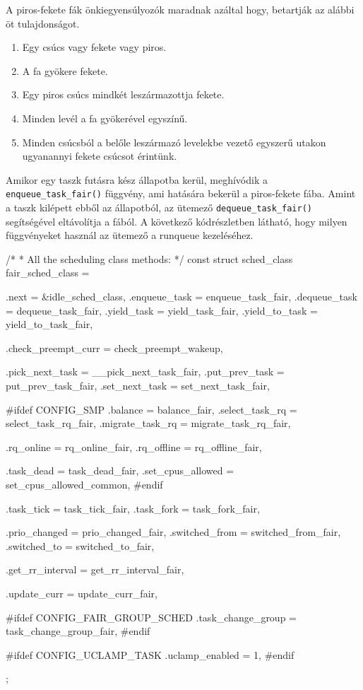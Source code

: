 \noindent A piros-fekete fák önkiegyensúlyozók maradnak azáltal hogy, betartják az alábbi öt tulajdonságot.

\begin{enumerate}
	\item Egy csúcs vagy fekete vagy piros.
	\item A fa gyökere fekete.
	\item Egy piros csúcs mindkét leszármazottja fekete.
	\item Minden levél a fa gyökerével egyszínű. 
	\item Minden csúcsból a belőle leszármazó levelekbe vezető egyszerű utakon ugyanannyi fekete csúcsot érintünk.
\end{enumerate}

Amikor egy taszk futásra kész állapotba kerül, meghívódik a \texttt{enqueue\_task\_fair()}  függvény, ami hatására bekerül a piros-fekete fába. Amint a taszk kilépett ebből az állapotból, az ütemező \texttt{dequeue\_task\_fair()} segítségével eltávolítja a fából.
A következő kódrészletben látható, hogy milyen függvényeket használ az ütemező a runqueue kezeléséhez.

\begin{cpp}
/*
 * All the scheduling class methods:
 */
const struct sched_class fair_sched_class = {
	.next			= &idle_sched_class,
	.enqueue_task		= enqueue_task_fair,
	.dequeue_task		= dequeue_task_fair,
	.yield_task		= yield_task_fair,
	.yield_to_task		= yield_to_task_fair,

	.check_preempt_curr	= check_preempt_wakeup,

	.pick_next_task		= __pick_next_task_fair,
	.put_prev_task		= put_prev_task_fair,
	.set_next_task          = set_next_task_fair,

#ifdef CONFIG_SMP
	.balance		= balance_fair,
	.select_task_rq		= select_task_rq_fair,
	.migrate_task_rq	= migrate_task_rq_fair,

	.rq_online		= rq_online_fair,
	.rq_offline		= rq_offline_fair,

	.task_dead		= task_dead_fair,
	.set_cpus_allowed	= set_cpus_allowed_common,
#endif

	.task_tick		= task_tick_fair,
	.task_fork		= task_fork_fair,

	.prio_changed		= prio_changed_fair,
	.switched_from		= switched_from_fair,
	.switched_to		= switched_to_fair,

	.get_rr_interval	= get_rr_interval_fair,

	.update_curr		= update_curr_fair,

#ifdef CONFIG_FAIR_GROUP_SCHED
	.task_change_group	= task_change_group_fair,
#endif

#ifdef CONFIG_UCLAMP_TASK
	.uclamp_enabled		= 1,
#endif
};
\end{cpp}

